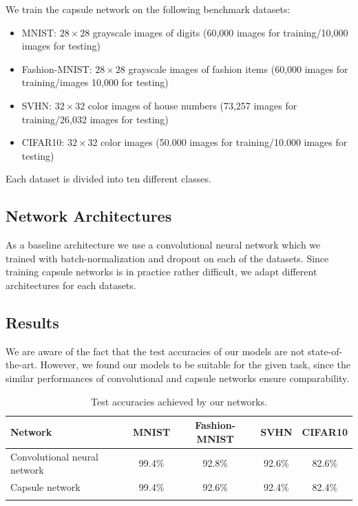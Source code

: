 \documentclass{article}
\begin{document}
We train the capsule network on the following benchmark datasets:
\begin{itemize}
	\item MNIST: $28\times28$ grayscale images of digits (60,000  images for training/10,000  images for testing) \cite{mnist}
	\item Fashion-MNIST:  $28\times28$ grayscale images of fashion items (60,000 images for training/images 10,000 for testing) \cite{fashion}
	\item SVHN: $32\times32$ color images of house numbers (73,257  images for training/26,032  images for testing) \cite{svhn}
	\item CIFAR10: $32\times32$ color images (50.000  images for training/10.000  images for testing) \cite{cifar}
\end{itemize}
Each dataset is divided into ten different classes.

\subsection{Network Architectures}
As a baseline architecture we use a convolutional neural network which we trained with batch-normalization and dropout on each of the datasets. Since training capsule networks is in practice rather difficult, we adapt different architectures for each datasets.

\subsection{Results}

We are aware of the fact that the test accuracies of our models are not state-of-the-art. However, we found our models to be suitable for the given task, since the similar performances of convolutional and capsule networks ensure comparability.

\begin{table}[h]
	\centering
	\begin{tabular}{lcccc}
		\toprule
		Network       & MNIST & Fashion-MNIST & SVHN & CIFAR10  \\
		\midrule
		Convolutional neural network & 99.4\% & 92.8\% & 92.6\% & 82.6\% \\
		Capsule network            & 99.4\% & 92.6\% & 92.4\% & 82.4\% \\
		\bottomrule\\
	\end{tabular}
	\label{tab:accuracies}
	\caption{Test accuracies achieved by our networks.}
\end{table}
\end{document}
